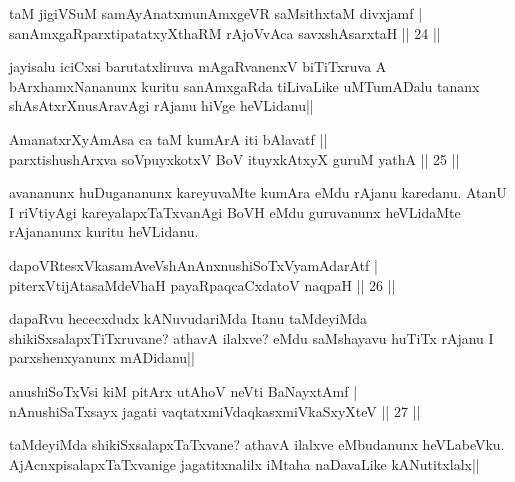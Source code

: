 \begin{shl}
taM jigiVSuM samAyAnatxmunAmxgeVR saMsithxtaM divxjamf | \\
sanAmxgaRparxtipatatxyXthaRM rAjoVvAca savxshAsarxtaH \hfill|| 24 || 
\end{shl}

\begin{artha}
jayisalu iciCxsi barutatxliruva mAgaRvanenxV biTiTxruva A 
bArxhamxNananunx kuritu sanAmxgaRda tiLivaLike uMTumADalu tananx 
shAsAtxrXnusAravAgi rAjanu hiVge heVLidanu||
\end{artha}

\begin{shl}
AmanatxrXyAmAsa ca taM kumArA iti bAlavatf || \\
parxtishushArxva soV\s puyxkotxV BoV ituyxkAtxyX guruM yathA \hfill|| 25 || 
\end{shl}

\begin{artha}
avananunx huDugananunx kareyuvaMte kumAra eMdu rAjanu karedanu. AtanU 
I riVtiyAgi kareyalapxTaTxvanAgi BoVH eMdu guruvanunx heVLidaMte 
rAjananunx kuritu heVLidanu.
\end{artha}


\begin{shl}
dapoVRtesxVkasamAveVshAnAnxnushiSoTxV\s yamAdarAtf | \\
piterxVtijAtasaMdeVhaH payaRpaqcaCxdatoV naqpaH \hfill|| 26 || 
\end{shl}

\begin{artha}
dapaRvu hececxdudx kANuvudariMda Itanu taMdeyiMda 
shikiSxsalapxTiTxruvane? athavA ilalxve? eMdu saMshayavu huTiTx rAjanu 
I parxshenxyanunx mADidanu||
\end{artha}

\begin{shl}
anushiSoTxV\s si kiM pitArx utAhoV neVti BaNayxtAmf | \\
nAnushiSaTxsayx jagati vaqtatxmiVdaqkasxmiVkaSxyXteV \hfill|| 27 || 
\end{shl}

\begin{artha}
taMdeyiMda shikiSxsalapxTaTxvane? athavA ilalxve eMbudanunx 
heVLabeVku. AjAcnxpisalapxTaTxvanige jagatitxnalilx iMtaha naDavaLike 
kANutitxlalx||
\end{artha}


